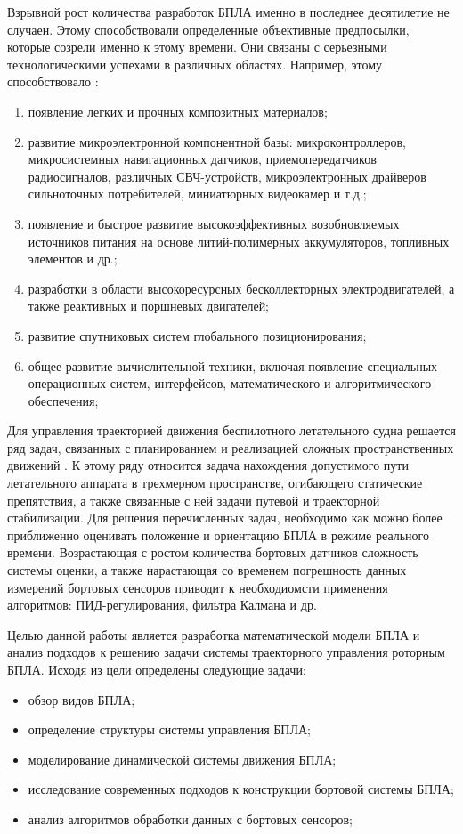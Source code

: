 \documentclass[nir, och, master]{SCWorks}
\begin{document}
Взрывной рост количества разработок БПЛА именно в последнее десятилетие не случаен. Этому 
способствовали определенные объективные предпосылки, которые созрели именно к этому времени. 
Они связаны с серьезными технологическими успехами в различных областях. Например, этому 
способствовало \cite{uvDev,kbpa}:
\begin{enumerate}
	\item появление легких и прочных композитных материалов;
	\item развитие микроэлектронной компонентной базы: микроконтроллеров, микросистемных навигационных 
	датчиков, приемопередатчиков радиосигналов, различных СВЧ-устройств, микроэлектронных драйверов 
	сильноточных потребителей, миниатюрных видеокамер и т.д.;
	\item появление и быстрое развитие высокоэффективных возобновляемых источников питания на основе 
	литий-полимерных аккумуляторов, топливных элементов и др.;
	\item разработки в области высокоресурсных бесколлекторных электродвигателей, а также 
	реактивных и поршневых двигателей;
	\item развитие спутниковых систем глобального позиционирования;
	\item общее развитие вычислительной техники, включая появление специальных операционных систем, 
	интерфейсов, математического и алгоритмического обеспечения;
\end{enumerate}


Для управления траекторией движения беспилотного летательного судна решается ряд задач, связанных с планированием и реализацией сложных 
пространственных движений \cite{kbpa}. К этому ряду относится задача нахождения допустимого пути летательного аппарата 
в трехмерном пространстве, огибающего статические препятствия, а также связанные с ней задачи путевой и траекторной  стабилизации. 
Для решения перечисленных задач, необходимо как можно более приближенно оценивать положение и ориентацию БПЛА в режиме реального времени. 
Возрастающая с ростом количества бортовых датчиков сложность системы оценки, а также нарастающая со временем погрешность данных измерений 
бортовых сенсоров приводит к необходиомсти применения алгоритмов: ПИД-регулирования, фильтра Калмана и др.   


Целью данной работы является разработка математической модели БПЛА и анализ подходов к решению задачи системы траекторного управления роторным БПЛА. 
Исходя из цели определены следующие задачи:
\begin{itemize}
	\item обзор видов БПЛА;
	\item определение структуры системы управления БПЛА;
	\item моделирование динамической системы движения БПЛА;
	\item исследование современных подходов к конструкции бортовой системы БПЛА;
	\item анализ алгоритмов обработки данных с бортовых сенсоров;
\end{itemize}
 
\end{document}

